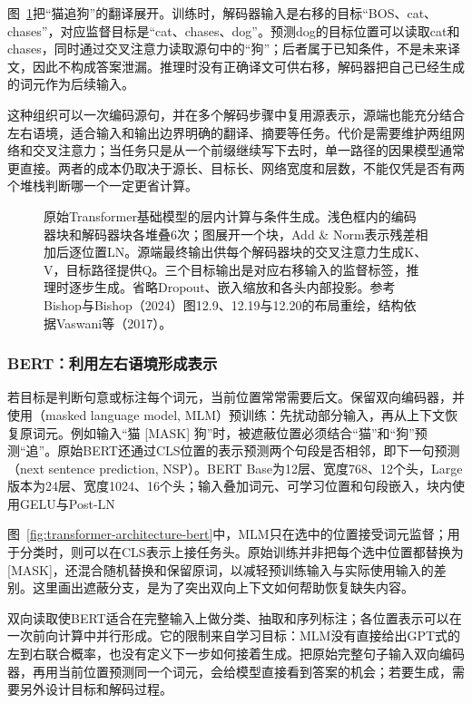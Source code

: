 图~\ref{fig:transformer-architecture-original}把“猫追狗”的翻译展开。训练时，解码器输入是右移的目标“BOS、cat、chases”，对应监督目标是“cat、chases、dog”。预测dog的目标位置可以读取cat和chases，同时通过交叉注意力读取源句中的“狗”；后者属于已知条件，不是未来译文，因此不构成答案泄漏。推理时没有正确译文可供右移，解码器把自己已经生成的词元作为后续输入。

这种组织可以一次编码源句，并在多个解码步骤中复用源表示，源端也能充分结合左右语境，适合输入和输出边界明确的翻译、摘要等任务。代价是需要维护两组网络和交叉注意力；当任务只是从一个前缀继续写下去时，单一路径的因果模型通常更直接。两者的成本仍取决于源长、目标长、网络宽度和层数，不能仅凭是否有两个堆栈判断哪一个一定更省计算。

\begin{figure}[p]
  \centering
  
  \caption{原始Transformer基础模型的层内计算与条件生成。浅色框内的编码器块和解码器块各堆叠6次；图展开一个块，Add \& Norm表示残差相加后逐位置LN。源端最终输出供每个解码器块的交叉注意力生成K、V，目标路径提供Q。三个目标输出是对应右移输入的监督标签，推理时逐步生成。省略Dropout、嵌入缩放和各头内部投影。参考Bishop与Bishop（2024）图12.9、12.19与12.20的布局重绘，结构依据Vaswani等（2017）。}
  \label{fig:transformer-architecture-original}
\end{figure}
\FloatBarrier

\subsubsection{BERT：利用左右语境形成表示}

若目标是判断句意或标注每个词元，当前位置常常需要后文。保留双向编码器，并使用（masked language model, MLM）预训练：先扰动部分输入，再从上下文恢复原词元。例如输入“猫 [MASK] 狗”时，被遮蔽位置必须结合“猫”和“狗”预测“追”。原始BERT还通过CLS位置的表示预测两个句段是否相邻，即下一句预测（next sentence prediction, NSP）。BERT Base为12层、宽度768、12个头，Large版本为24层、宽度1024、16个头；输入叠加词元、可学习位置和句段嵌入，块内使用GELU与Post-LN

图~\ref{fig:transformer-architecture-bert}中，MLM只在选中的位置接受词元监督；用于分类时，则可以在CLS表示上接任务头。原始训练并非把每个选中位置都替换为[MASK]，还混合随机替换和保留原词，以减轻预训练输入与实际使用输入的差别。这里画出遮蔽分支，是为了突出双向上下文如何帮助恢复缺失内容。

双向读取使BERT适合在完整输入上做分类、抽取和序列标注；各位置表示可以在一次前向计算中并行形成。它的限制来自学习目标：MLM没有直接给出GPT式的左到右联合概率，也没有定义下一步如何接着生成。把原始完整句子输入双向编码器，再用当前位置预测同一个词元，会给模型直接看到答案的机会；若要生成，需要另外设计目标和解码过程。

